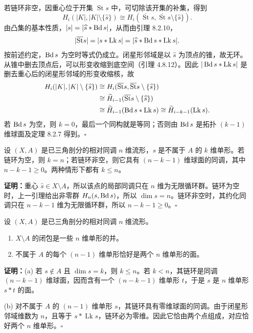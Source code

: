 若链环非空，因重心位于开集 $\operatorname{St}s$ 中，可切除该开集的补集，得到
\[
H_i(|K|,|K|\setminus\{\widehat s\})\cong
H_i(\overline{\operatorname{St}}s,\overline{\operatorname{St}}s\setminus\{\widehat s\}).
\]
由凸集的基本性质，$|s|=|\widehat s*\operatorname{Bd} s|$，从而由引理 8.2.10，
\[
|\overline{\operatorname{St}}s|=|s*\operatorname{Lk}s|
=|\widehat s*\operatorname{Bd} s*\operatorname{Lk}s|.
\]
按前述约定，$\operatorname{Bd} s$ 为空时等式仍成立。闭星形邻域是以 $\widehat s$ 为顶点的锥，故无环。从锥中删去顶点后，可以形变收缩到底空间（引理 4.8.12）。因此 $|\operatorname{Bd} s*\operatorname{Lk}s|$ 是删去重心后的闭星形邻域的形变收缩核，故
\begin{align*}
H_i(|K|,|K|\setminus\{\widehat s\})
&\cong H_i(\overline{\operatorname{St}}s,\overline{\operatorname{St}}s\setminus\{\widehat s\})\\
&\cong\widetilde H_{i-1}(\overline{\operatorname{St}}s\setminus\{\widehat s\})\\
&\cong\widetilde H_{i-1}(\operatorname{Bd} s*\operatorname{Lk}s)
\cong\widetilde H_{i-k-1}(\operatorname{Lk}s).
\end{align*}
若 $\operatorname{Bd} s$ 为空，则 $k=0$，最后一个同构就是等同；否则由 $\operatorname{Bd} s$ 是拓扑 $(k-1)$ 维球面及定理 8.2.7 得到。\hfill$\square$

设 $(X,A)$ 是已三角剖分的相对同调 $n$ 维流形，$s$ 是不属于 $A$ 的 $k$ 维单形。若链环为空，则 $k=n$；若链环非空，则它具有 $(n-k-1)$ 维球面的同调，其中 $n-k-1\ge0$。两种情形下都有 $k\le n$。

\textbf{证明：}重心 $\widehat s\in X\setminus A$，所以该点的局部同调只在 $n$ 维为无限循环群。链环为空时，上一引理给出非零群 $H_n(s,\operatorname{Bd} s)$，所以 $\dim s=n$。链环非空时，其约化同调只在 $n-k-1$ 维为无限循环群，所以 $n-k-1\ge0$。\hfill$\square$

设 $(X,A)$ 是已三角剖分的相对同调 $n$ 维流形。
\begin{enumerate}[label=(\alph*)]
\item $X\setminus A$ 的闭包是一些 $n$ 维单形的并。
\item 不属于 $A$ 的每个 $(n-1)$ 维单形恰好是两个 $n$ 维单形的面。
\end{enumerate}

\textbf{证明：}(a) 若 $s\notin A$ 且 $\dim s=k$，则 $k\le n$。若 $k<n$，其链环是同调 $(n-k-1)$ 维球面，因而含有一个 $(n-k-1)$ 维单形 $t$，于是 $s$ 是 $n$ 维单形 $s*t$ 的面。

(b) 对不属于 $A$ 的 $(n-1)$ 维单形 $s$，其链环具有零维球面的同调。由于闭星形邻域维数为 $n$，且等于 $s*\operatorname{Lk}s$，链环必为零维。因此它恰由两个点组成，对应恰好两个 $n$ 维单形。\hfill$\square$

